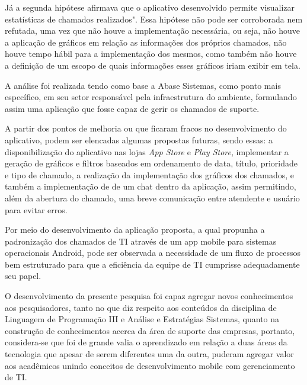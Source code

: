 Já a segunda hipótese afirmava que o aplicativo desenvolvido permite visualizar estatísticas de chamados realizados". Essa hipótese não pode ser corroborada nem refutada, uma vez que não houve a implementação necessária, ou seja, não houve a aplicação de gráficos em relação as informações dos próprios chamados, não houve tempo hábil para a implementação dos mesmos, como também não houve a definição de um escopo de quais informações esses gráficos iriam exibir em tela.

A análise foi realizada tendo como base a Abase Sistemas, como ponto mais específico, em seu setor responsável pela infraestrutura do ambiente, formulando assim uma aplicação que fosse capaz de gerir os chamados de suporte.

A partir dos pontos de melhoria ou que ficaram fracos no desenvolvimento do aplicativo, podem ser elencadas algumas propostas futuras, sendo essas: a disponibilização do aplicativo nas lojas \textit{App Store} e \textit{Play Store}, implementar a geração de gráficos e filtros baseados em ordenamento de data, título, prioridade e tipo de chamado, a realização da implementação dos gráficos dos chamados, e também a implementação de de um chat dentro da aplicação, assim permitindo, além da abertura do chamado, uma breve comunicação entre atendente e usuário para evitar erros.

Por meio do desenvolvimento da aplicação proposta, a qual propunha a padronização dos chamados de TI através de um app mobile para sistemas operacionais Android, pode ser observada a necessidade de um fluxo de processos bem estruturado para que a eficiência da equipe de TI cumprisse adequadamente seu papel.

O desenvolvimento da presente pesquisa foi capaz agregar novos conhecimentos aos pesquisadores, tanto no que diz respeito aos conteúdos da disciplina de Linguagem de Programação III e Análise e Estratégias Sistemas, quanto na construção de conhecimentos acerca da área de suporte das empresas, portanto, considera-se que foi de grande valia o aprendizado em relação a duas áreas da tecnologia que apesar de serem diferentes uma da outra, puderam agregar valor aos acadêmicos unindo conceitos de desenvolvimento mobile com gerenciamento de TI.